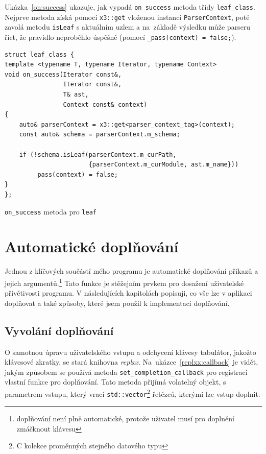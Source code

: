 \documentclass[thesis=B,czech,hidelinks]{FITthesis}[2019/03/06]
\newcommand{\Rplus}{\protect\hspace{-.1em}\protect\raisebox{.35ex}{\smaller{\smaller\textbf{+}}}}
\newcommand{\Cpp}{\mbox{C\Rplus\Rplus}\xspace}
\begin{document}
Ukázka~\ref{on:success} ukazuje, jak vypadá \verb¨on_success¨ metoda třídy \texttt{leaf\_class}. Nejprve metoda získá pomocí \texttt{x3::get} vloženou instanci \texttt{ParserContext}, poté zavolá metodu \texttt{isLeaf} s aktuálním uzlem a na~základě výsledku může parseru říct, že pravidlo neproběhlo úspěšně (pomocí \verb¨_pass(context) = false;¨).

\begin{listing}[H]
\begin{verbatim}
struct leaf_class {
template <typename T, typename Iterator, typename Context>
void on_success(Iterator const&,
                Iterator const&,
                T& ast,
                Context const& context)
{
    auto& parserContext = x3::get<parser_context_tag>(context);
    const auto& schema = parserContext.m_schema;

    if (!schema.isLeaf(parserContext.m_curPath,
                       {parserContext.m_curModule, ast.m_name}))
        _pass(context) = false;
}
};
\end{verbatim}
\caption{\texttt{on\_success} metoda pro \texttt{leaf}}\label{on:success}
\end{listing}

\section{Automatické doplňování}\label{completion}
Jednou z klíčových součástí mého programu je automatické doplňování příkazů a jejich argumentů.\footnote{doplňování není plně automatické, protože uživatel musí pro doplnění zmáčknout klávesu} Tato funkce je stěžejním prvkem pro dosažení uživatelské přívětivosti programu. V následujících kapitolách popisuji, co vše lze v aplikaci doplňovat a také způsoby, které jsem použil k implementaci doplňování.

\subsection{Vyvolání doplňování}
O samotnou úpravu uživatelského vstupu a odchycení klávesy tabulátor, jakožto klávesové zkratky, se stará knihovna \textit{replxx}. Na~ukázce~\ref{replxx:callback} je vidět, jakým způsobem se používá metoda \texttt{set\_completion\_callback} pro registraci vlastní funkce pro doplňování. Tato metoda přijímá volatelný objekt, s parametrem vstupu, který vrací \texttt{std::vector}\footnote{\Cpp{} kolekce proměnných stejného datového typu} řetězců, kterými lze vstup doplnit.
\end{document}
